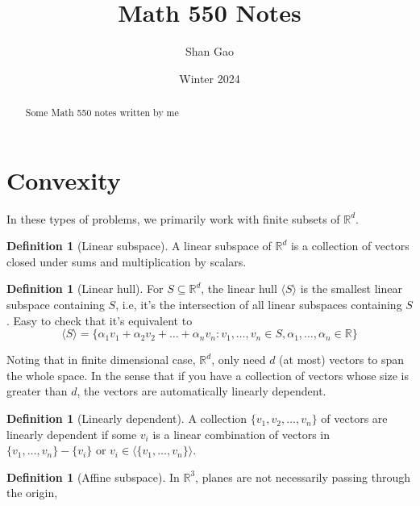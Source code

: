 \documentclass{tufte-handout}
\title{Math 550 Notes}
\author{Shan Gao}
\date{Winter 2024}  %
\theoremstyle{definition}
\newtheorem{defn}[thm]{Definition}
\theoremstyle{remark}
\begin{document}
\maketitle%

\begin{abstract}
\noindent Some Math 550 notes written by me
\end{abstract}


\section{Convexity}

In these types of problems, we primarily work with finite subsets of $\mathbb{R}^d$. 
\begin{defn}[Linear subspace]
	A linear subspace of $\mathbb{R}^d$ is a collection of vectors closed under sums and multiplication by scalars. 
\end{defn}

\begin{defn}[Linear hull]
	For $S \subseteq \mathbb{R}^d$, the linear hull $\langle S \rangle$ is the smallest linear subspace containing $S$, i.e, it's the intersection of all linear subspaces containing $S$. Easy to check that it's equivalent to 
	$$ \langle S \rangle = \{ \alpha_1v_1 + \alpha_2 v_2 + \ldots + \alpha_n v_n \colon v_1,\ldots,v_n \in S, \alpha_1,\ldots,\alpha_n \in \mathbb{R}\}$$
	
\end{defn}
Noting that in finite dimensional case, $\mathbb{R}^d$, only need $d$ (at most) vectors to span the whole space. In the sense that if you have a collection of vectors whose size is greater than $d$, the vectors are automatically linearly dependent. 
\begin{defn}[Linearly dependent]
	A collection $\{v_1,v_2,\ldots,v_n\}$ of vectors are linearly dependent if some $v_i$ is a linear combination of vectors in $\{v_1,\ldots,v_n\} - \{v_i\}$ or $v_i \in \langle \{v_1,\ldots,v_n\} \rangle$. 
\end{defn}
\begin{defn}[Affine subspace]
	In $\mathbb{R}^3$, planes are not necessarily passing through the origin, 
\end{defn}



\end{document}
